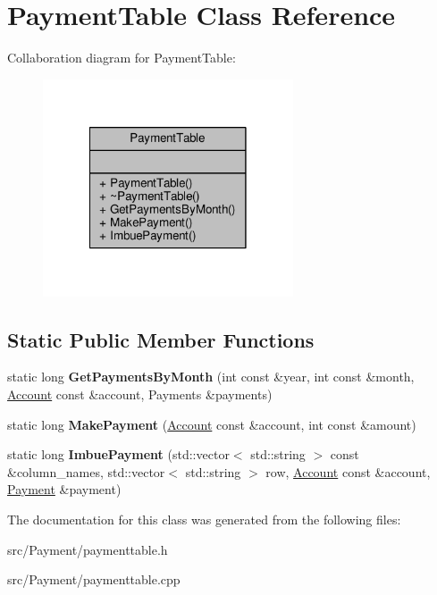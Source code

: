 \hypertarget{classPaymentTable}{\section{Payment\-Table Class Reference}
\label{classPaymentTable}
}


Collaboration diagram for Payment\-Table\-:
\nopagebreak
\begin{figure}[H]
\begin{center}
\leavevmode
\includegraphics[width=210pt]{classPaymentTable__coll__graph}
\end{center}
\end{figure}
\subsection*{Static Public Member Functions}
\begin{DoxyCompactItemize}
\item 
\hypertarget{classPaymentTable_a8315ac37f00c78ba2e7d34af3b56ad9c}{static long {\bfseries Get\-Payments\-By\-Month} (int const \&year, int const \&month, \hyperlink{classAccount}{Account} const \&account, Payments \&payments)}\label{classPaymentTable_a8315ac37f00c78ba2e7d34af3b56ad9c}

\item 
\hypertarget{classPaymentTable_a935803f44af6e0c1437cfb9fb91b18f9}{static long {\bfseries Make\-Payment} (\hyperlink{classAccount}{Account} const \&account, int const \&amount)}\label{classPaymentTable_a935803f44af6e0c1437cfb9fb91b18f9}

\item 
\hypertarget{classPaymentTable_a73f9f69d18377f6bb395e1396eaefd2f}{static long {\bfseries Imbue\-Payment} (std\-::vector$<$ std\-::string $>$ const \&column\-\_\-names, std\-::vector$<$ std\-::string $>$ row, \hyperlink{classAccount}{Account} const \&account, \hyperlink{classPayment}{Payment} \&payment)}\label{classPaymentTable_a73f9f69d18377f6bb395e1396eaefd2f}

\end{DoxyCompactItemize}


The documentation for this class was generated from the following files\-:\begin{DoxyCompactItemize}
\item 
src/\-Payment/paymenttable.\-h\item 
src/\-Payment/paymenttable.\-cpp\end{DoxyCompactItemize}
